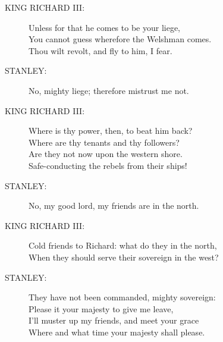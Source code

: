 \documentclass{article}
\begin{document}
\begin{description}
\item[KING RICHARD III:] 
\hspace{1pt}Unless for that he comes to be your liege,\\
\hspace{1pt}You cannot guess wherefore the Welshman comes.\\
\hspace{1pt}Thou wilt revolt, and fly to him, I fear.\\
\end{description}
\begin{description}
\item[STANLEY:] 
\hspace{1pt}No, mighty liege; therefore mistrust me not.\\
\end{description}
\begin{description}
\item[KING RICHARD III:] 
\hspace{1pt}Where is thy power, then, to beat him back?\\
\hspace{1pt}Where are thy tenants and thy followers?\\
\hspace{1pt}Are they not now upon the western shore.\\
\hspace{1pt}Safe-conducting the rebels from their ships!\\
\end{description}
\begin{description}
\item[STANLEY:] 
\hspace{1pt}No, my good lord, my friends are in the north.\\
\end{description}
\begin{description}
\item[KING RICHARD III:] 
\hspace{1pt}Cold friends to Richard: what do they in the north,\\
\hspace{1pt}When they should serve their sovereign in the west?\\
\end{description}
\begin{description}
\item[STANLEY:] 
\hspace{1pt}They have not been commanded, mighty sovereign:\\
\hspace{1pt}Please it your majesty to give me leave,\\
\hspace{1pt}I'll muster up my friends, and meet your grace\\
\hspace{1pt}Where and what time your majesty shall please.\\
\end{description}
\end{document}

